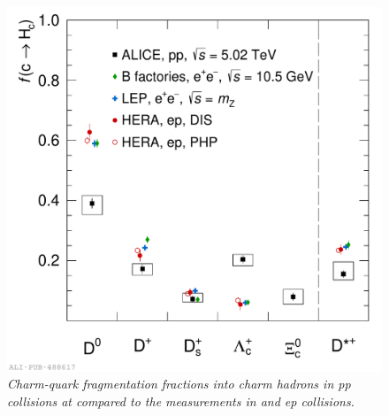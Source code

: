 \begin{figure}[ht!]
    \centering
    \includegraphics[width=.85\textwidth]{fig/FF5tev.pdf}
    \caption{\it Charm-quark fragmentation fractions into charm hadrons in pp collisions at \tevf compared to the measurements in \ee and ep collisions.}
    \label{cff}
\end{figure}


